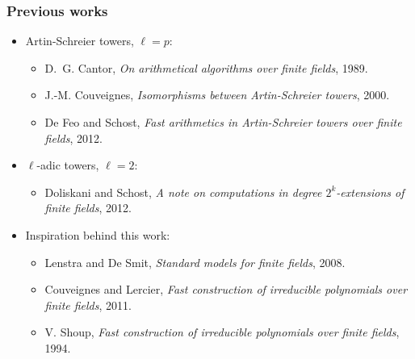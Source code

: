 \documentclass[10pt]{beamer}
\begin{document}

\begin{frame}
	\frametitle{Previous works}
	
	\begin{itemize}
		\item Artin-Schreier towers, $\ell=p$:
		\begin{itemize}
			\item D.~G. Cantor, \textit{On arithmetical algorithms over finite fields}, 1989.
			\item J.-M. Couveignes, \textit{Isomorphisms between {A}rtin-{S}chreier towers}, 2000.
			\item De Feo and Schost, \textit{Fast arithmetics in {A}rtin-{S}chreier towers over finite fields}, 2012.
		\end{itemize}
		\item $\ell$-adic towers, $\ell = 2$:
		\begin{itemize}
			\item Doliskani and Schost, \textit{A note on computations in degree $2^k$-extensions of finite fields}, 2012.
		\end{itemize}
		\item Inspiration behind this work:
		\begin{itemize}
			\item Lenstra and De Smit, \textit{Standard models for finite fields}, 2008.
			\item Couveignes and Lercier, \textit{Fast construction of irreducible polynomials over finite fields}, 2011.
			\item V. Shoup, \textit{Fast construction of irreducible polynomials over finite fields}, 1994.
		\end{itemize}
	\end{itemize}
\end{frame}

\end{document}
